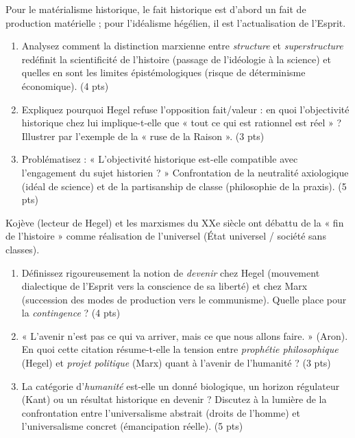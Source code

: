 \documentclass[11pt]{article}
\begin{document}
\begin{exercice}
Pour le matérialisme historique, le fait historique est d'abord un fait de production matérielle ; pour l'idéalisme hégélien, il est l'actualisation de l'Esprit.
\begin{enumerate}
    \item Analysez comment la distinction marxienne entre \textit{structure} et \textit{superstructure} redéfinit la scientificité de l'histoire (passage de l'idéologie à la science) et quelles en sont les limites épistémologiques (risque de déterminisme économique). (4 pts)
    \item Expliquez pourquoi Hegel refuse l'opposition fait/valeur : en quoi l'objectivité historique chez lui implique-t-elle que « tout ce qui est rationnel est réel » ? Illustrer par l'exemple de la « ruse de la Raison ». (3 pts)
    \item Problématisez : « L'objectivité historique est-elle compatible avec l'engagement du sujet historien ? » Confrontation de la neutralité axiologique (idéal de science) et de la partisanship de classe (philosophie de la praxis). (5 pts)
\end{enumerate}
\end{exercice}

\begin{exercice}
Kojève (lecteur de Hegel) et les marxismes du XXe siècle ont débattu de la « fin de l'histoire » comme réalisation de l'universel (État universel / société sans classes).
\begin{enumerate}
    \item Définissez rigoureusement la notion de \textit{devenir} chez Hegel (mouvement dialectique de l'Esprit vers la conscience de sa liberté) et chez Marx (succession des modes de production vers le communisme). Quelle place pour la \textit{contingence} ? (4 pts)
    \item « L'avenir n'est pas ce qui va arriver, mais ce que nous allons faire. » (Aron). En quoi cette citation résume-t-elle la tension entre \textit{prophétie philosophique} (Hegel) et \textit{projet politique} (Marx) quant à l'avenir de l'humanité ? (3 pts)
    \item La catégorie d'\textit{humanité} est-elle un donné biologique, un horizon régulateur (Kant) ou un résultat historique en devenir ? Discutez à la lumière de la confrontation entre l'universalisme abstrait (droits de l'homme) et l'universalisme concret (émancipation réelle). (5 pts)
\end{enumerate}
\end{exercice}
\end{document}
